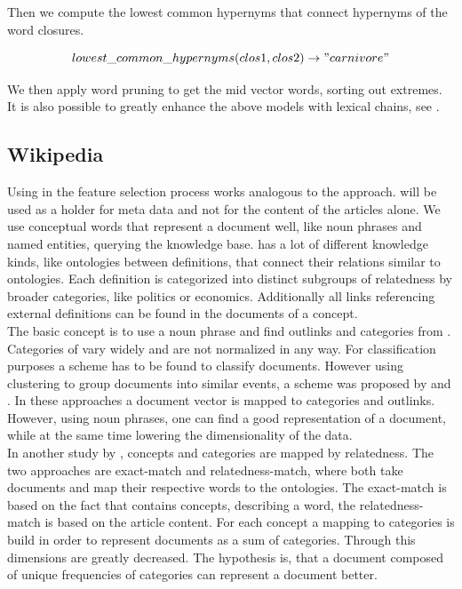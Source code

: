   Then we compute the lowest common hypernyms that connect hypernyms of the word closures.

    \begin{equation}
      lowest\_common\_hypernyms(clos1, clos2) \to "carnivore"
    \end{equation}

  We then apply word pruning to get the mid vector words, sorting out extremes. It is also possible to greatly enhance the above models with lexical chains, see \cite{SemanticClusteringWithWordnet}.

  \subsection{Wikipedia}
  \label{sec:wikpedia}

  Using \wiki{} in the feature selection process works analogous to the \wordnet{} approach. \wiki{} will be used as a holder for meta data and not for the content of the articles alone. We use conceptual words that represent a document well, like noun phrases and named entities, querying the \wiki{} knowledge base. \wiki{} has a lot of different knowledge kinds, like ontologies between definitions, that connect their relations similar to \wordnet{} ontologies. Each definition is categorized into distinct subgroups of relatedness by broader categories, like politics or economics. Additionally all links referencing external definitions can be found in the documents of a \wiki{} concept.\\

  The basic concept is to use a noun phrase and find outlinks and categories from \wiki{}. Categories of \wiki{} vary widely and are not normalized in any way. For classification purposes a scheme has to be found to classify documents. However using clustering to group documents into similar events, a scheme was proposed by \cite{WikipediaClustering2010} and \cite{WikipediaClusteringSim2009}. In these approaches a document vector is mapped to categories and outlinks. However, using noun phrases, one can find a good representation of a document, while at the same time lowering the dimensionality of the  data.\\

  In another study by \cite{WikipediaClusteringSim2009}, concepts and categories are mapped by relatedness. The two approaches are exact-match and relatedness-match, where both take documents and map their respective words to the \wiki{} ontologies. The exact-match is based on the fact that \wiki{} contains concepts, describing a word, the relatedness-match is based on the article content. For each concept a mapping to categories is build in order to represent documents as a sum of \wiki{} categories. Through this dimensions are greatly decreased. The hypothesis is, that a document composed of unique frequencies of categories can represent a document better.\\

